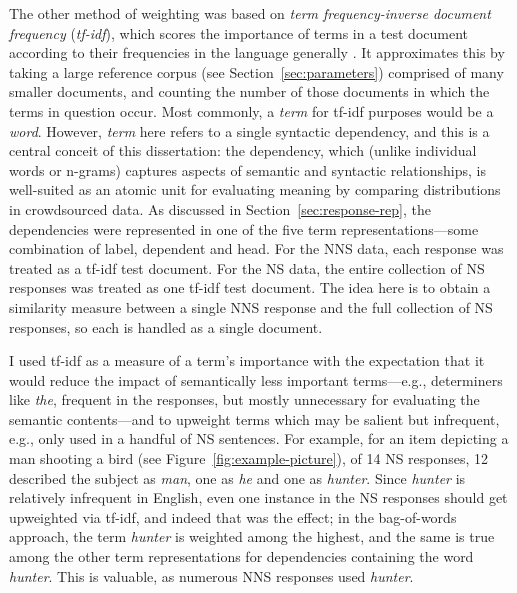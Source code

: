 The other method of weighting was based on \textit{term frequency-inverse document frequency} (\textit{tf-idf}), which scores the importance of terms in a test document according to their frequencies in the language generally \cite{schutze2008introduction}. It approximates this by taking a large reference corpus (see Section~\ref{sec:parameters}) comprised of many smaller documents, and counting the number of those documents in which the terms in question occur. Most commonly, a \textit{term} for tf-idf purposes would be a \textit{word}. However, \textit{term} here refers to a single syntactic dependency, and this is a central conceit of this dissertation:  the dependency, which (unlike individual words or n-grams) captures aspects of semantic and syntactic relationships, is well-suited as an atomic unit for evaluating meaning by comparing distributions in crowdsourced data. As discussed in Section~\ref{sec:response-rep}, the dependencies were represented in one of the five term representations---some combination of label, dependent and head. For the NNS data, each response was treated as a tf-idf test document. For the NS data, the entire collection of NS responses was treated as one tf-idf test document. The idea here is to obtain a similarity measure between a single NNS response and the full collection of NS responses, so each is handled as a single document.

I used tf-idf as a measure of a term's importance with the expectation that it would reduce the impact
of semantically less important terms---e.g., determiners like
\textit{the}, frequent in the responses, but mostly unnecessary for evaluating the
semantic contents---and to upweight terms which may
be salient but infrequent, e.g., only used in a handful of NS
sentences. For example, for an item depicting a man shooting a bird
(see Figure~\ref{fig:example-picture}), of 14 NS responses, 12 described the subject as \textit{man}, one as \textit{he} and one as
\textit{hunter}. Since \textit{hunter} is relatively infrequent in English, even
one instance in the NS responses should get upweighted via tf-idf, and indeed
that was the effect; in the bag-of-words approach, the term \textit{hunter} is weighted among the highest, and the same is true among the other term representations for dependencies containing the word \textit{hunter}. This is valuable, as numerous NNS responses used \textit{hunter}.

